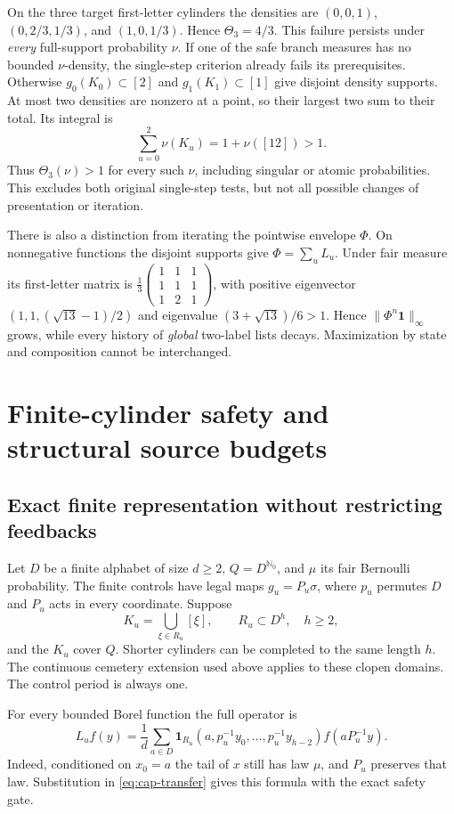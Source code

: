 \documentclass[11pt,reqno]{amsart}
\numberwithin{equation}{section}
\theoremstyle{definition}
\newcommand{\Nzero}{\mathbb N_0}
\newcommand{\one}{\mathbf 1}
\begin{document}
On the three target first-letter cylinders the densities are
$(0,0,1)$, $(0,2/3,1/3)$, and $(1,0,1/3)$.
Hence $\Theta_3=4/3$. This failure persists under \emph{every}
full-support probability $\nu$. If one of the safe branch measures
has no bounded $\nu$-density, the single-step criterion already
fails its prerequisites. Otherwise $g_0(K_0)\subset[2]$ and
$g_1(K_1)\subset[1]$ give disjoint density supports. At most two
densities are nonzero at a point, so their largest two sum to their
total. Its integral is
\[
 \sum_{u=0}^2\nu(K_u)=1+\nu([12])>1.
\]
Thus $\Theta_3(\nu)>1$ for every such $\nu$, including singular
or atomic probabilities. This excludes both original single-step
tests, but not all possible changes of presentation or iteration.

There is also a distinction from iterating the pointwise envelope
$\Phi$. On nonnegative functions the disjoint supports give
$\Phi=\sum_uL_u$. Under fair measure its first-letter matrix is
$\frac13\left(\begin{smallmatrix}1&1&1\\1&1&1\\1&2&1\end{smallmatrix}\right)$,
with positive eigenvector
$(1,1,(\sqrt{13}-1)/2)$ and eigenvalue
$(3+\sqrt{13})/6>1$. Hence $\|\Phi^n\one\|_\infty$ grows,
while every history of \emph{global} two-label lists decays.
Maximization by state and composition cannot be interchanged.

\section{Finite-cylinder safety and structural source budgets}\label{sec:cylinder}

\subsection{Exact finite representation without restricting feedbacks}
Let $D$ be a finite alphabet of size $d\ge2$, $Q=D^{\Nzero}$,
and $\mu$ its fair Bernoulli probability. The finite controls have
legal maps $g_u=P_u\sigma$, where $p_u$ permutes $D$ and $P_u$
acts in every coordinate. Suppose
\[
 K_u=\bigcup_{\xi\in R_u}[\xi],\qquad R_u\subset D^h,
 \quad h\ge2,
\]
and the $K_u$ cover $Q$. Shorter cylinders can be completed to the
same length $h$. The continuous cemetery extension used above
applies to these clopen domains. The control period is always one.

For every bounded Borel function the full operator is
\begin{equation}\label{eq:cyl-operator}
 L_uf(y)=\frac1d\sum_{a\in D}
 \one_{R_u}(a,p_u^{-1}y_0,\ldots,p_u^{-1}y_{h-2})
 f(aP_u^{-1}y).
\end{equation}
Indeed, conditioned on $x_0=a$ the tail of $x$ still has law $\mu$,
and $P_u$ preserves that law. Substitution in
\eqref{eq:cap-transfer} gives this formula with the exact safety gate.
\end{document}
